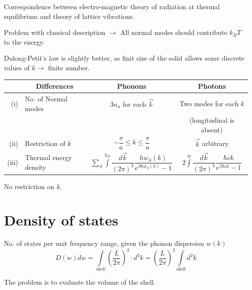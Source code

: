 Correspondence between electro-magnetic theory of radiation at thermal equilibrium and theory of lattice vibrations.

Problem with classical description $\to$ All normal modes should contribute $k_{B}T$ to the energy.

Dulong-Petit's law is slightly better, as finit size of the solid allows some discrete values of $k\to$ finite number.
\begin{center}
\renewcommand{\arraystretch}{1.5}
\begin{tabular}{rlcc}
\hline
 & \multicolumn{1}{c}{\bf Differences} & {\bf Phonons} & {\bf Photons}\\
\hline
(i) & No. of Normal modes & $3n_{a}$ for each $\overrightarrow{k}$ & Two modes for each $k$\\
    &                     &                                       & (longitudinal is absent)\\[5pt]
(ii) & Restriction of $k$ & $-\dfrac{\pi}{a}\leq k\leq \dfrac{\pi}{a}$ & $\overrightarrow{k}$ arbitrary\\[10pt]
(iii) & Thermal energy density & $\sum\limits_{S}\int\limits^{k_{D}}\dfrac{d\overrightarrow{k}}{(2\pi)^{3}}\dfrac{hw_{S}(k)}{e^{\partial \hbar w_{S}(k)}-1}$ & $2\int\limits^{\infty}\dfrac{d\overrightarrow{k}}{(2\pi)^{3}}\dfrac{\hbar ck}{e^{\beta \hbar ck}-1}$\\
\hline
\end{tabular}
\end{center}
No restriction on $k$.

\section*{Density of states}

No. of states per unit frequency range, given the phonon dispersion $w(k)$
$$
D(w)dw=\int\limits_{\text{shell}}\left(\dfrac{L}{2\pi}\right)^{3}\cdot d^{3}k=\left(\dfrac{L}{2\pi}\right)^{3}\int\limits_{\text{shell}}d^{3}k
$$

The problem is to evaluate the volume of the shell.

